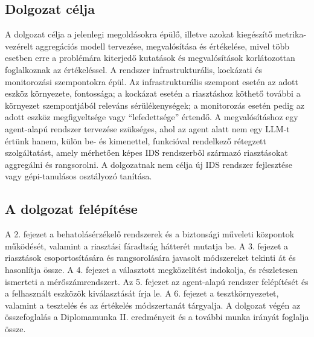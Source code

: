 \subsection{Dolgozat célja}\label{sec:celok}
A dolgozat célja a jelenlegi megoldásokra épülő, illetve azokat kiegészítő metrika-vezérelt aggregációs modell tervezése, megvalósítása és értékelése, mivel több esetben erre a problémára kiterjedő kutatások és megvalósítások korlátozottan foglalkoznak az értékeléssel. A rendszer infrastrukturális, kockázati és monitorozási szempontokra épül. Az infrastrukturális szempont esetén az adott eszköz környezete, fontossága; a kockázat esetén a riasztáshoz köthető további a környezet szempontjából releváns sérülékenységek; a monitorozás esetén pedig az adott eszköz megfigyeltsége vagy \enquote{lefedettsége} értendő. A megvalósításhoz egy agent-alapú rendszer tervezése szükséges, ahol az agent alatt nem egy \ac{LLM}-t értünk hanem, külön be- és kimenettel, funkcióval rendelkező rétegzett szolgáltatást, amely mérhetően képes \ac{IDS} rendszerből származó riasztásokat aggregálni és rangsorolni. A dolgozatnak nem célja új \ac{IDS} rendszer fejlesztése vagy gépi-tanulásos osztályozó tanítása.

\subsection{A dolgozat felépítése}\label{sec:felepites}
A 2. fejezet a behatolásérzékelő rendszerek és a biztonsági műveleti központok működését, valamint a riasztási fáradtság hátterét mutatja be. A 3. fejezet a riasztások csoportosítására és rangsorolására javasolt módszereket tekinti át és hasonlítja össze. A 4. fejezet a választott megközelítést indokolja, és részletesen ismerteti a mérőszámrendszert. Az 5. fejezet az agent-alapú rendszer felépítését és a felhasznált eszközök kiválasztását írja le. A 6. fejezet a tesztkörnyezetet, valamint a tesztelés és az értékelés módszertanát tárgyalja. A dolgozat végén az összefoglalás a Diplomamunka II. eredményeit és a további munka irányát foglalja össze.
